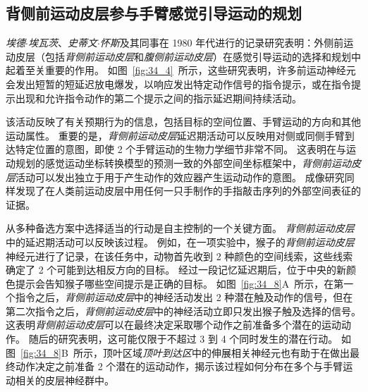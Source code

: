 \subsection{背侧前运动皮层参与手臂感觉引导运动的规划}

\textit{埃德$\cdot$埃瓦茨}、\textit{史蒂文$\cdot$怀斯}及其同事在 1980 年代进行的记录研究表明：外侧前运动皮层（包括\textit{背侧前运动皮层}和\textit{腹侧前运动皮层}）在感觉引导运动的选择和规划中起着至关重要的作用。
如图~\ref{fig:34_4}~所示，这些研究表明，许多前运动神经元会发出短暂的短延迟放电爆发，以响应发出特定动作信号的指令提示，或在指令提示出现和允许指令动作的第二个提示之间的指示延迟期间持续活动。


该活动反映了有关预期行为的信息，包括目标的空间位置、手臂运动的方向和其他运动属性。
重要的是，\textit{背侧前运动皮层}延迟期活动可以反映用对侧或同侧手臂到达特定位置的意图，即使 2 个手臂运动的生物力学细节非常不同。
这表明在与运动规划的感觉运动坐标转换模型的预测一致的外部空间坐标框架中，\textit{背侧前运动皮层}活动可以发出独立于用于产生动作的效应器产生运动动作的意图。
成像研究同样发现了在人类前运动皮层中用任何一只手制作的手指敲击序列的外部空间表征的证据。


从多种备选方案中选择适当的行动是自主控制的一个关键方面。
\textit{背侧前运动皮层}中的延迟期活动可以反映该过程。
例如，在一项实验中，猴子的\textit{背侧前运动皮层}神经元进行了记录，在该任务中，动物首先收到 2 种颜色的空间线索，这些线索确定了 2 个可能到达相反方向的目标。
经过一段记忆延迟期后，位于中央的新颜色提示会告知猴子哪些空间提示是正确的目标。
如图~\ref{fig:34_8}A~所示，在第一个指令之后，\textit{背侧前运动皮层}中的神经活动发出 2 种潜在触及动作的信号，但在第二次指令之后，\textit{背侧前运动皮层}中的神经活动立即只发出猴子触及选择的信号。
这表明\textit{背侧前运动皮层}可以在最终决定采取哪个动作之前准备多个潜在的运动动作。
随后的研究表明，这可能仅限于不超过 3 到 4 个同时发生的潜在行动。
如图~\ref{fig:34_8}B~所示，顶叶区域\textit{顶叶到达区}中的伸展相关神经元也有助于在做出最终动作决定之前准备 2 个潜在的运动动作，揭示该过程如何分布在多个与手臂运动相关的皮层神经群中。


